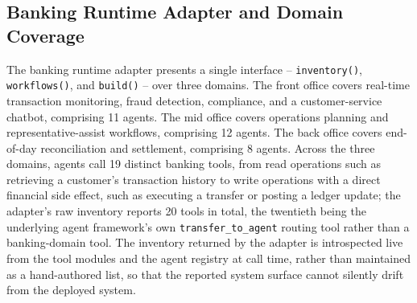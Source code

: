 \documentclass[conference]{IEEEtran}
\begin{document}
\subsection{Banking Runtime Adapter and Domain Coverage}
The banking runtime adapter presents a single interface -- \texttt{inventory()}, \texttt{workflows()}, and \texttt{build()} -- over three domains. The front office covers real-time transaction monitoring, fraud detection, compliance, and a customer-service chatbot, comprising 11 agents. The mid office covers operations planning and representative-assist workflows, comprising 12 agents. The back office covers end-of-day reconciliation and settlement, comprising 8 agents. Across the three domains, agents call 19 distinct banking tools, from read operations such as retrieving a customer's transaction history to write operations with a direct financial side effect, such as executing a transfer or posting a ledger update; the adapter's raw inventory reports 20 tools in total, the twentieth being the underlying agent framework's own \texttt{transfer\_to\_agent} routing tool rather than a banking-domain tool. The inventory returned by the adapter is introspected live from the tool modules and the agent registry at call time, rather than maintained as a hand-authored list, so that the reported system surface cannot silently drift from the deployed system.
\end{document}
